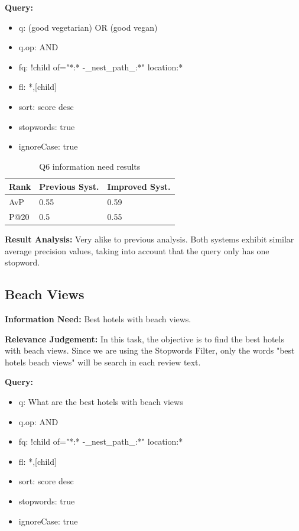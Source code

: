 \documentclass[sigconf]{acmart}
\begin{document}
\textbf{Query:}

\begin{itemize}
    \item q: (good vegetarian) OR (good vegan)
    \item q.op: AND
    \item fq: {!child of="*:* -\_nest\_path\_:*"} location:*
    \item fl: *,[child]
    \item sort: score desc
    \item stopwords: true
    \item ignoreCase: true
\end{itemize}

\begin{table}[H]
\caption{Q6 information need results}
\label{tab:q6}
\begin{tabular}{lll}
\toprule
Rank & Previous Syst. & Improved Syst.\\
\midrule
AvP & 0.55 & 0.59  \\
P@20 & 0.5 & 0.55 \\
\bottomrule
\end{tabular}
\end{table}

\textbf{Result Analysis:} Very alike to previous analysis. Both systems exhibit similar average precision values, taking into account that the query only has one stopword.


\subsection{Beach Views}

\textbf{Information Need:} Best hotels with beach views.

\textbf{Relevance Judgement:} In this task, the objective is to find the best hotels with beach views. Since we are using the Stopwords Filter, only the words "best hotels beach views" will be search in each review text.

\textbf{Query:}

\begin{itemize}
    \item q: What are the best hotels with beach views
    \item q.op: AND
    \item fq: {!child of="*:* -\_nest\_path\_:*"} location:*
    \item fl: *,[child]
    \item sort: score desc
    \item stopwords: true
    \item ignoreCase: true
\end{itemize}
\end{document}
